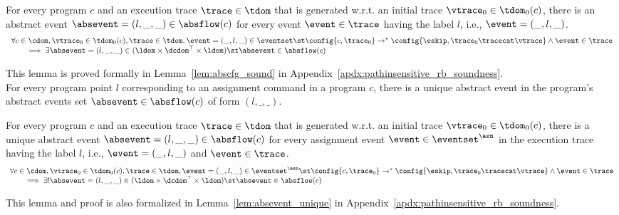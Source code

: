    \begin{lem}
     \label{lem:abscfg_sound}
     For every program $c$ and
     an execution trace $\trace \in \tdom$ that is generated w.r.t.
     an initial trace  $\vtrace_0 \in \tdom_0(c)$,
     there is an abstract event $\absevent = (l, \_, \_) \in \absflow(c)$ 
     for every event $\event \in \trace$ having the label $l$, i.e., $\event = (\_, l, \_)$.
   \[
     \begin{array}{l}
       \forall c \in \cdom, \vtrace_0 \in \tdom_0(c), \trace \in \tdom ,  \event = (\_, l, \_) \in \eventset \st
   \config{{c}, \trace_0} \to^{*} \config{\eskip, \trace_0 \tracecat \vtrace} 
   \land \event \in \trace 
   \\
   \qquad \implies \exists \absevent = (l, \_, \_) \in (\ldom\times \dcdom^{\top} \times \ldom) \st 
   \absevent \in \absflow(c)
   \end{array}
   \]
   \end{lem}
This lemma is proved formally in Lemma~\ref{lem:abscfg_sound} in Appendix~\ref{apdx:pathinsensitive_rb_soundness}.
\\
For every program point $l$ corresponding to an assignment command in a program $c$,
there is a unique abstract event in the program's abstract events set $\absevent \in \absflow(c)$ of form $(l, \_, \_)$. 
\begin{lem}
  \label{lem:abscfg_unique}
  For every program $c$ and
  an execution trace $\trace \in \tdom$ that is generated w.r.t.
  an initial trace  $\vtrace_0 \in \tdom_0(c)$,
  there is a unique abstract event $\absevent = (l, \_, \_) \in \absflow(c)$ 
  for every assignment event $\event \in \eventset^{\asn}$ in the
  execution trace having the label $l$, i.e., $\event = (\_, l, \_)$ and  $\event \in \trace$.
%
\[
  \begin{array}{l}
    \forall c \in \cdom, \vtrace_0 \in \tdom_0(c), \trace \in \tdom ,  \event = (\_, l, \_) \in \eventset^{\asn} \st
\config{{c}, \trace_0} \to^{*} \config{\eskip, \trace_0 \tracecat \vtrace} 
\land \event \in \trace 
\\
\qquad \implies \exists! \absevent = (l, \_, \_) \in (\ldom\times \dcdom^{\top} \times \ldom) \st 
\absevent \in \absflow(c)
\end{array}
\]
\end{lem}
This lemma and proof is also 
formalized in Lemma~\ref{lem:absevent_unique} in Appendix~\ref{apdx:pathinsensitive_rb_soundness}.

